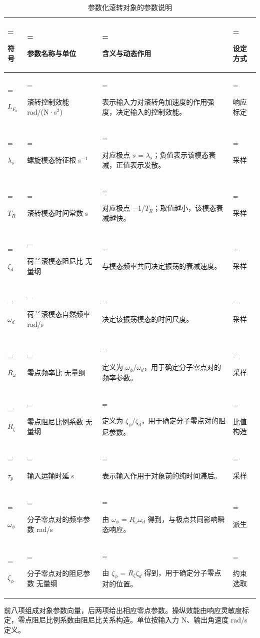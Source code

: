 \documentclass[UTF8,a4paper,11pt,fontset=fandol,scheme=plain]{ctexart}
\begin{document}
\begin{table}[!htbp]\centering
\hypertarget{model-parameter-table}{}\label{model-parameter-table}
\caption{参数化滚转对象的参数说明}
\small\setlength{\tabcolsep}{4pt}\renewcommand{\arraystretch}{1.18}
\begin{tabularx}{\linewidth}{>{\hsize=0.6\hsize\linewidth=\hsize\raggedright\arraybackslash}X>{\hsize=1.05\hsize\linewidth=\hsize\raggedright\arraybackslash}X>{\hsize=1.8\hsize\linewidth=\hsize\raggedright\arraybackslash}X>{\hsize=0.55\hsize\linewidth=\hsize\raggedright\arraybackslash}X}\toprule
符号 & 参数名称与单位 & 含义与动态作用 & 设定方式 \\
\midrule
\(L_{F_{a}}\) & 滚转控制效能\newline{} rad/(N·s\ensuremath{{}^2}) & 表示输入力对滚转角加速度的作用强度，决定输入的控制效能。 & 响应标定 \\
\(\lambda_{s}\) & 螺旋模态特征根\newline{} s\ensuremath{{}^-}\ensuremath{{}^1} & 对应极点 \(s\) = \(\lambda_{s}\)；负值表示该模态衰减，正值表示发散。 & 采样 \\
\(T_{R}\) & 滚转模态时间常数\newline{} s & 对应极点 \ensuremath{-}1/\(T_{R}\)；取值越小，该模态衰减越快。 & 采样 \\
\(\zeta_{d}\) & 荷兰滚模态阻尼比\newline{} 无量纲 & 与模态频率共同决定振荡的衰减速度。 & 采样 \\
\(\omega_{d}\) & 荷兰滚模态自然频率\newline{} rad/s & 决定该振荡模态的时间尺度。 & 采样 \\
\(R_{\omega}\) & 零点频率比\newline{} 无量纲 & 定义为 \(\omega_{\phi}\)/\(\omega_{d}\)，用于确定分子零点对的频率参数。 & 采样 \\
\(R_{\zeta}\) & 零点阻尼比例系数\newline{} 无量纲 & 定义为 \(\zeta_{\phi}\)/\(\zeta_{d}\)，用于确定分子零点对的阻尼参数。 & 比值构造 \\
\(\tau_{p}\) & 输入运输时延\newline{} s & 表示输入作用于对象前的纯时间滞后。 & 采样 \\
\(\omega_{\phi}\) & 分子零点对的频率参数\newline{} rad/s & 由 \(\omega_{\phi}\) = \(R_{\omega}\)\(\omega_{d}\) 得到，与极点共同影响瞬态响应。 & 派生 \\
\(\zeta_{\phi}\) & 分子零点对的阻尼参数\newline{} 无量纲 & 由 \(\zeta_{\phi}\) = \(R_{\zeta}\)\(\zeta_{d}\) 得到，用于确定分子零点对的位置。 & 约束选取 \\
\bottomrule\end{tabularx}\end{table}
\hypertarget{model-parameter-note}{}\label{model-parameter-note}
前八项组成对象参数向量，后两项给出相应零点参数。操纵效能由响应灵敏度标定，零点阻尼比例系数由阻尼比关系构造。单位按输入力 N、输出角速度 rad/s 定义。
\end{document}
